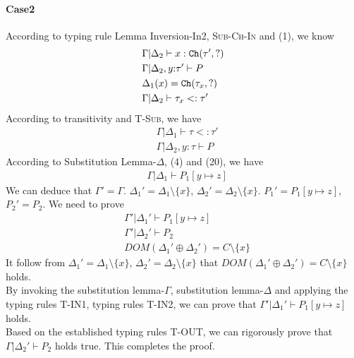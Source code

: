 \documentclass[master,english]{kuisthesis}
\theoremstyle{definition}
\begin{document}
\paragraph{Case2} According to typing rule Lemma Inversion-In2, \textsc{Sub-Ch-In} and (1), we know
\begin{align}
    &\Gamma | \Delta_2 \vdash x : {\tt Ch}({\tau', ?})
    \\&\Gamma| \Delta_2, y{:}\tau'  \vdash P 
    \\&\Delta_1(x) = {\tt Ch}({\tau_x, ?})
     \\&\Gamma | \Delta_2 \vdash \tau_x <: \tau'
\end{align}\noindent
According to transitivity and \textsc{T-Sub}, we have
\begin{align}
    &\Gamma | \Delta_1 \vdash \tau <: \tau'
    \\&\Gamma| \Delta_2, y{:}\tau  \vdash P
\end{align}\noindent
According to Substitution Lemma-$\Delta$, (4) and (20), we have
\begin{align}
    &\Gamma | \Delta_1 \vdash P_1[y \mapsto z]
\end{align}\noindent
We can deduce that $\Gamma' = \Gamma$. $\Delta_1' = \Delta_1 \setminus \{x\}$, $\Delta_2' = \Delta_2 \setminus \{x\}$. $P_1' = P_1[y \mapsto z]$, $P_2' = P_2$. We need to prove
\begin{align*}
    &\Gamma' | \Delta_1' \vdash P_1[y \mapsto z]
    \\&\Gamma' | \Delta_2' \vdash P_2
    \\&DOM(\Delta_1' \oplus \Delta_2') = C \setminus \{x\}
\end{align*}\noindent
It follow from $\Delta_1' = \Delta_1 \setminus \{x\}$, $\Delta_2' = \Delta_2 \setminus \{x\}$ that  $DOM(\Delta_1' \oplus \Delta_2') = C \setminus \{x\}$ holds. 
\\By invoking the substitution lemma-$\Gamma$, substitution lemma-$\Delta$ and applying the typing rules \textsc{T-IN1}, typing rules \textsc{T-IN2}, we can  prove that $\Gamma' | \Delta_1' \vdash P_1[y \mapsto z] $ holds.
\\Based on the established typing rules \textsc{T-OUT}, we can rigorously prove that $\Gamma | \Delta_2' \vdash P_2 $ holds true. This completes the proof.\\
\end{document}
